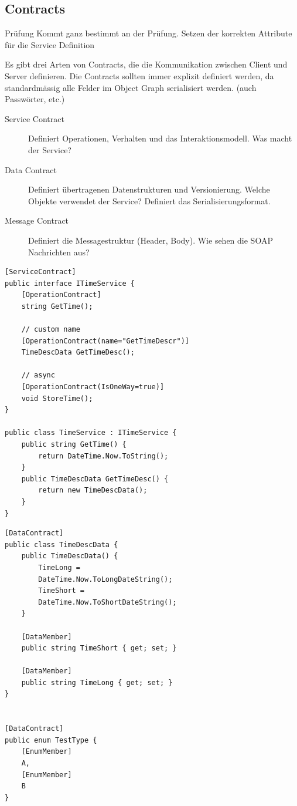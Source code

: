 \documentclass[
a4paper,
oneside,
10pt,
fleqn,
headsepline,
toc=listofnumbered, 
bibliography=totocnumbered]{scrartcl}
\begin{document}
\clearpage

\subsection{Contracts}
\begin{hint}{Prüfung}{}
	Kommt ganz bestimmt an der Prüfung. Setzen der korrekten Attribute für die Service Definition
\end{hint}
Es gibt drei Arten von Contracts, die die Kommunikation zwischen Client und Server definieren. Die Contracts sollten immer explizit definiert werden, da standardmässig alle Felder im Object Graph serialisiert werden. (auch Passwörter, etc.)
\begin{description}
	\item[Service Contract] Definiert Operationen, Verhalten und das Interaktionsmodell. Was macht der Service?
	\item[Data Contract] Definiert übertragenen Datenstrukturen und Versionierung. Welche Objekte verwendet der Service? Definiert das Serialisierungsformat.
	\item[Message Contract] Definiert die Messagestruktur (Header, Body). Wie sehen die SOAP Nachrichten aus?
\end{description}
\begin{lstlisting}[caption=Service Contract]
[ServiceContract]
public interface ITimeService {
	[OperationContract]
	string GetTime();

	// custom name
	[OperationContract(name="GetTimeDescr")]
	TimeDescData GetTimeDesc();
	
	// async
	[OperationContract(IsOneWay=true)]
	void StoreTime();
}

public class TimeService : ITimeService {
	public string GetTime() { 
		return DateTime.Now.ToString(); 
	}
	public TimeDescData GetTimeDesc() { 
		return new TimeDescData();
	}
}
\end{lstlisting}

\begin{lstlisting}[caption=Data Contract]
[DataContract]
public class TimeDescData {
	public TimeDescData() {
		TimeLong =
		DateTime.Now.ToLongDateString();
		TimeShort =
		DateTime.Now.ToShortDateString();
	}
	
	[DataMember]
	public string TimeShort { get; set; }
	
	[DataMember]
	public string TimeLong { get; set; }
}


[DataContract]
public enum TestType {
	[EnumMember]
	A,
	[EnumMember]
	B
}
\end{lstlisting}
\end{document}
